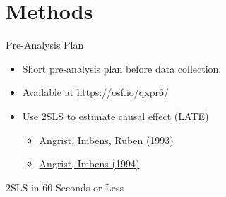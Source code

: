 \documentclass{beamer}
\begin{document}
{ %
    \begin{frame}[plain]
     \end{frame}
}
\section{Methods}
\begin{frame}{Pre-Analysis Plan}

\begin{itemize}
\item Short pre-analysis plan before data collection.
\item Available at \url{https://osf.io/qxpr6/}
\item Use 2SLS to estimate causal effect (LATE)
\begin{itemize}
\item \href{http://www.tandfonline.com/doi/abs/10.1080/01621459.1996.10476902}{Angrist, Imbens, Ruben (1993)}
\item  \href{http://www.nber.org/papers/t0118}{Angrist, Imbens (1994)}
\end{itemize} 
\end{itemize}
\end{frame}

\begin{frame}{2SLS in 60 Seconds or Less}

\end{frame}
\end{document}
